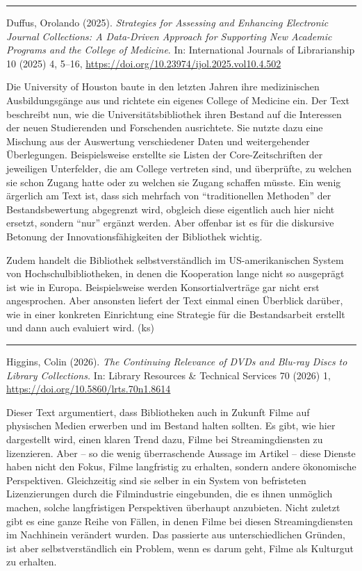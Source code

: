 \documentclass[a4paper,
fontsize=11pt,
oneside,
numbers=noperiodatend,
parskip=half-,
bibliography=totoc,
final
]{scrartcl}
\begin{document}
\begin{center}\rule{0.5\linewidth}{0.5pt}\end{center}

Duffus, Orolando (2025). \emph{Strategies for Assessing and Enhancing
Electronic Journal Collections: A Data-Driven Approach for Supporting
New Academic Programs and the College of Medicine}. In: International
Journals of Librarianship 10 (2025) 4, 5--16,
\url{https://doi.org/10.23974/ijol.2025.vol10.4.502}

Die University of Houston baute in den letzten Jahren ihre medizinischen
Ausbildungsgänge aus und richtete ein eigenes College of Medicine ein.
Der Text beschreibt nun, wie die Universitätsbibliothek ihren Bestand
auf die Interessen der neuen Studierenden und Forschenden ausrichtete.
Sie nutzte dazu eine Mischung aus der Auswertung verschiedener Daten und
weitergehender Überlegungen. Beispielsweise erstellte sie Listen der
Core-Zeitschriften der jeweiligen Unterfelder, die am College vertreten
sind, und überprüfte, zu welchen sie schon Zugang hatte oder zu welchen
sie Zugang schaffen müsste. Ein wenig ärgerlich am Text ist, dass sich
mehrfach von \enquote{traditionellen Methoden} der Bestandsbewertung
abgegrenzt wird, obgleich diese eigentlich auch hier nicht ersetzt,
sondern \enquote{nur} ergänzt werden. Aber offenbar ist es für die
diskursive Betonung der Innovationsfähigkeiten der Bibliothek wichtig.

Zudem handelt die Bibliothek selbstverständlich im US-amerikanischen
System von Hochschulbibliotheken, in denen die Kooperation lange nicht
so ausgeprägt ist wie in Europa. Beispielsweise werden
Konsortialverträge gar nicht erst angesprochen. Aber ansonsten liefert
der Text einmal einen Überblick darüber, wie in einer konkreten
Einrichtung eine Strategie für die Bestandsarbeit erstellt und dann auch
evaluiert wird. (ks)

\begin{center}\rule{0.5\linewidth}{0.5pt}\end{center}

Higgins, Colin (2026). \emph{The Continuing Relevance of DVDs and
Blu-ray Discs to Library Collections.} In: Library Resources \&
Technical Services 70 (2026) 1,
\url{https://doi.org/10.5860/lrts.70n1.8614}

Dieser Text argumentiert, dass Bibliotheken auch in Zukunft Filme auf
physischen Medien erwerben und im Bestand halten sollten. Es gibt, wie
hier dargestellt wird, einen klaren Trend dazu, Filme bei
Streamingdiensten zu lizenzieren. Aber -- so die wenig überraschende
Aussage im Artikel -- diese Dienste haben nicht den Fokus, Filme
langfristig zu erhalten, sondern andere ökonomische Perspektiven.
Gleichzeitig sind sie selber in ein System von befristeten
Lizenzierungen durch die Filmindustrie eingebunden, die es ihnen
unmöglich machen, solche langfristigen Perspektiven überhaupt
anzubieten. Nicht zuletzt gibt es eine ganze Reihe von Fällen, in denen
Filme bei diesen Streamingdiensten im Nachhinein verändert wurden. Das
passierte aus unterschiedlichen Gründen, ist aber selbstverständlich ein
Problem, wenn es darum geht, Filme als Kulturgut zu erhalten.
\end{document}

